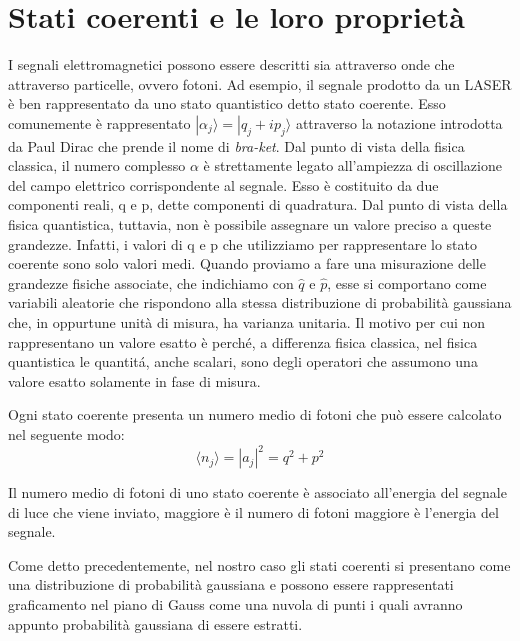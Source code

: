 \section{Stati coerenti e le loro propriet\`a}\label{se:sezione1-1}
I segnali elettromagnetici possono essere descritti sia attraverso onde che attraverso particelle, ovvero fotoni. Ad esempio, il segnale prodotto da un LASER è ben rappresentato da uno stato quantistico detto stato coerente. Esso comunemente \`e rappresentato $|\alpha_j \rangle = |q_j + ip_j \rangle $ attraverso la notazione introdotta da Paul Dirac che prende il nome di \textit{bra-ket}. Dal punto di vista della fisica classica, il numero complesso $\alpha$ è strettamente legato all'ampiezza di oscillazione del campo elettrico corrispondente al segnale. Esso è costituito da due componenti reali, q e p, dette componenti di quadratura. Dal punto di vista della fisica quantistica, tuttavia, non è possibile assegnare un valore preciso a queste grandezze. Infatti, i valori di q e p che utilizziamo per rappresentare lo stato coerente sono solo valori medi. Quando proviamo a fare una misurazione delle grandezze fisiche associate, che indichiamo con $\hat q$ e $\hat p$, esse si comportano come variabili aleatorie che rispondono alla stessa distribuzione di probabilit\`a gaussiana che, in oppurtune unit\`a di misura, ha varianza unitaria. Il motivo per cui non rappresentano un valore esatto \`e perch\'e, a differenza fisica classica, nel fisica quantistica le quantit\'a, anche scalari, sono degli operatori che assumono una valore esatto solamente in fase di misura.

Ogni stato coerente presenta un numero medio di fotoni che pu\`o essere calcolato nel seguente modo:
\begin{equation}
\langle n_j \rangle = |a_j|^2 = q^2 + p^2 
\end{equation}

Il numero medio di fotoni di uno stato coerente \`e associato all'energia del segnale di luce che viene inviato, maggiore \`e il numero di fotoni maggiore \`e l'energia del segnale.

Come detto precedentemente, nel nostro caso gli stati coerenti si presentano come una distribuzione di probabilit\`a gaussiana e possono essere rappresentati graficamento nel piano di Gauss come una nuvola di punti i quali avranno appunto probabilit\`a gaussiana di essere estratti.


